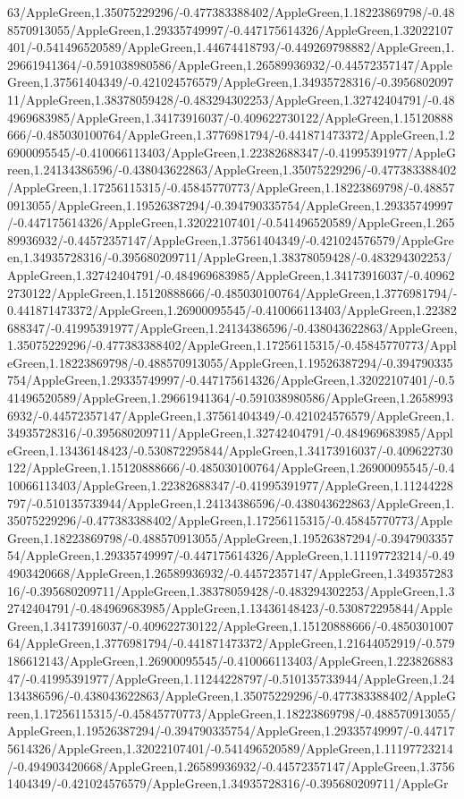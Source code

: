 {\begin{tikzternal}
{63/AppleGreen,1.35075229296/-0.477383388402/AppleGreen,1.18223869798/-0.488570913055/AppleGreen,1.29335749997/-0.447175614326/AppleGreen,1.32022107401/-0.541496520589/AppleGreen,1.44674418793/-0.449269798882/AppleGreen,1.29661941364/-0.591038980586/AppleGreen,1.26589936932/-0.44572357147/AppleGreen,1.37561404349/-0.421024576579/AppleGreen,1.34935728316/-0.395680209711/AppleGreen,1.38378059428/-0.483294302253/AppleGreen,1.32742404791/-0.484969683985/AppleGreen,1.34173916037/-0.409622730122/AppleGreen,1.15120888666/-0.485030100764/AppleGreen,1.3776981794/-0.441871473372/AppleGreen,1.26900095545/-0.410066113403/AppleGreen,1.22382688347/-0.41995391977/AppleGreen,1.24134386596/-0.438043622863/AppleGreen,1.35075229296/-0.477383388402/AppleGreen,1.17256115315/-0.45845770773/AppleGreen,1.18223869798/-0.488570913055/AppleGreen,1.19526387294/-0.394790335754/AppleGreen,1.29335749997/-0.447175614326/AppleGreen,1.32022107401/-0.541496520589/AppleGreen,1.26589936932/-0.44572357147/AppleGreen,1.37561404349/-0.421024576579/AppleGreen,1.34935728316/-0.395680209711/AppleGreen,1.38378059428/-0.483294302253/AppleGreen,1.32742404791/-0.484969683985/AppleGreen,1.34173916037/-0.409622730122/AppleGreen,1.15120888666/-0.485030100764/AppleGreen,1.3776981794/-0.441871473372/AppleGreen,1.26900095545/-0.410066113403/AppleGreen,1.22382688347/-0.41995391977/AppleGreen,1.24134386596/-0.438043622863/AppleGreen,1.35075229296/-0.477383388402/AppleGreen,1.17256115315/-0.45845770773/AppleGreen,1.18223869798/-0.488570913055/AppleGreen,1.19526387294/-0.394790335754/AppleGreen,1.29335749997/-0.447175614326/AppleGreen,1.32022107401/-0.541496520589/AppleGreen,1.29661941364/-0.591038980586/AppleGreen,1.26589936932/-0.44572357147/AppleGreen,1.37561404349/-0.421024576579/AppleGreen,1.34935728316/-0.395680209711/AppleGreen,1.32742404791/-0.484969683985/AppleGreen,1.13436148423/-0.530872295844/AppleGreen,1.34173916037/-0.409622730122/AppleGreen,1.15120888666/-0.485030100764/AppleGreen,1.26900095545/-0.410066113403/AppleGreen,1.22382688347/-0.41995391977/AppleGreen,1.11244228797/-0.510135733944/AppleGreen,1.24134386596/-0.438043622863/AppleGreen,1.35075229296/-0.477383388402/AppleGreen,1.17256115315/-0.45845770773/AppleGreen,1.18223869798/-0.488570913055/AppleGreen,1.19526387294/-0.394790335754/AppleGreen,1.29335749997/-0.447175614326/AppleGreen,1.11197723214/-0.494903420668/AppleGreen,1.26589936932/-0.44572357147/AppleGreen,1.34935728316/-0.395680209711/AppleGreen,1.38378059428/-0.483294302253/AppleGreen,1.32742404791/-0.484969683985/AppleGreen,1.13436148423/-0.530872295844/AppleGreen,1.34173916037/-0.409622730122/AppleGreen,1.15120888666/-0.485030100764/AppleGreen,1.3776981794/-0.441871473372/AppleGreen,1.21644052919/-0.579186612143/AppleGreen,1.26900095545/-0.410066113403/AppleGreen,1.22382688347/-0.41995391977/AppleGreen,1.11244228797/-0.510135733944/AppleGreen,1.24134386596/-0.438043622863/AppleGreen,1.35075229296/-0.477383388402/AppleGreen,1.17256115315/-0.45845770773/AppleGreen,1.18223869798/-0.488570913055/AppleGreen,1.19526387294/-0.394790335754/AppleGreen,1.29335749997/-0.447175614326/AppleGreen,1.32022107401/-0.541496520589/AppleGreen,1.11197723214/-0.494903420668/AppleGreen,1.26589936932/-0.44572357147/AppleGreen,1.37561404349/-0.421024576579/AppleGreen,1.34935728316/-0.395680209711/AppleGr}
\end{tikzternal}}

